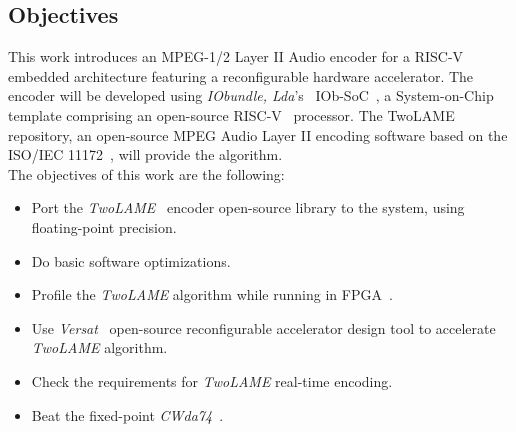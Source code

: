 \subsection{Objectives}

This work introduces an MPEG-1/2 Layer II Audio encoder for a RISC-V embedded architecture
featuring a reconfigurable hardware accelerator. The encoder will be developed using \textit{IObundle, Lda}'s~\cite{iobundle} IOb-SoC~\cite{bib:iobsoc-github}, a System-on-Chip template comprising an open-source RISC-V~\cite{riscv} processor. The TwoLAME~\cite{twolamerepo} repository, an open-source MPEG Audio Layer II encoding software based on the ISO/IEC 11172~\cite{11172}, will provide the algorithm.\\
The objectives of this work are the following:

\begin{itemize}
    \item Port the \textit{TwoLAME}~\cite{bib:twolame} encoder open-source library to the system, using floating-point precision.
    \item Do basic software optimizations.
    \item Profile the \textit{TwoLAME} algorithm while running in FPGA~\cite{fpga}.
    \item Use \textit{Versat}~\cite{bib:iobversat} open-source reconfigurable accelerator design tool to accelerate \textit{TwoLAME} algorithm.
    \item Check the requirements for \textit{TwoLAME} real-time encoding.
    \item Beat the fixed-point \textit{CWda74}~\cite{CWda74}.
\end{itemize}



